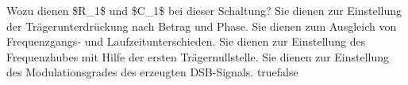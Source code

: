     {Wozu dienen \$R\_1\$ und \$C\_1\$ bei dieser Schaltung?  }
    {Sie dienen zur Einstellung der Trägerunterdrückung nach Betrag und Phase.}
    {Sie dienen zum Ausgleich von Frequenzgangs- und Laufzeitunterschieden.}
    {Sie dienen zur Einstellung des Frequenzhubes mit Hilfe der ersten Trägernullstelle.}
    {Sie dienen zur Einstellung des Modulationsgrades des erzeugten DSB-Signals.}
    {true}{false}